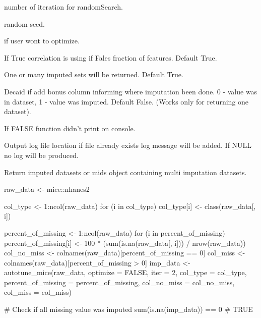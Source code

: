\documentclass[letterpaper]{book}
\begin{document}
\begin{Arguments}
\begin{ldescription}
\item[\code{iter}] number of iteration for randomSearch.

\item[\code{random.seed}] random seed.

\item[\code{optimize}] if user wont to optimize.

\item[\code{correlation}] If True correlation is using if Fales fraction of features. Default True.

\item[\code{return\_one}] One or many imputed sets will be returned. Default True.

\item[\code{col\_0\_1}] Decaid if add bonus column informing where imputation been done. 0 - value was in dataset, 1 - value was imputed. Default False. (Works only for returning one dataset).

\item[\code{verbose}] If FALSE function didn't print on console.

\item[\code{out\_file}] Output log file location if file already exists log message will be added. If NULL no log will be produced.
\end{ldescription}
\end{Arguments}
%
\begin{Value}
Return imputed datasets or mids object containing multi imputation datasets.
\end{Value}
%
\begin{Examples}
\begin{ExampleCode}
{
  raw_data <- mice::nhanes2

  col_type <- 1:ncol(raw_data)
  for (i in col_type) {
    col_type[i] <- class(raw_data[, i])
  }

  percent_of_missing <- 1:ncol(raw_data)
  for (i in percent_of_missing) {
    percent_of_missing[i] <- 100 * (sum(is.na(raw_data[, i])) / nrow(raw_data))
  }
  col_no_miss <- colnames(raw_data)[percent_of_missing == 0]
  col_miss <- colnames(raw_data)[percent_of_missing > 0]
  imp_data <- autotune_mice(raw_data, optimize = FALSE, iter = 2,
   col_type = col_type, percent_of_missing = percent_of_missing,
   col_no_miss = col_no_miss, col_miss = col_miss)

  # Check if all missing value was imputed
  sum(is.na(imp_data)) == 0
  # TRUE
}
\end{ExampleCode}
\end{Examples}
\end{document}
